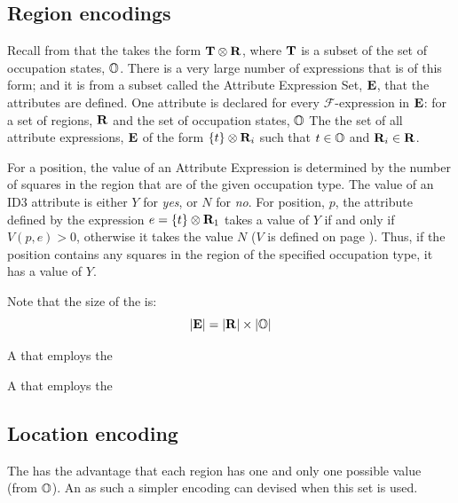 \subsection{Region encodings}
\label{sec:pos_attribs}
Recall from  that the  takes the form ${\bf T} \otimes {\bf R}$, where ${\bf T}$ is a subset of the set of occupation states, $\mathbb{O}$. There is a very large number of expressions that is of this form; and it is from a subset called the Attribute Expression Set, ${\bf E}$, that the attributes are defined.  One attribute is declared for every $\mathcal F$-expression in ${\bf E}$:
 {
for a set of regions, ${\bf R}$ and the set of occupation states, $\mathbb{O}$} {The the set of all attribute expressions, ${\bf E}$ of the form $\{t\} \otimes {\bf R}_i$ such that $t \in \mathbb{O} $ and $ {\bf R}_i \in {\bf R}$.}

For a position, the value of an Attribute Expression is determined by the number of squares in the region that are of the given occupation type.  The value of an ID3 attribute is either $Y$ for {\it yes}, or $N$ for {\it no}.  For position, $p$, the attribute defined by the expression $e = \{t\} \otimes {\bf R}_1$ takes a value of $Y$ if and only if $V(p,e) > 0$,  otherwise it takes the value $N$ ($V$ is defined on page  \pageref{sec:language-features}).  Thus, if the position contains any squares in the region of the specified occupation type, it has a value of $Y$.

Note that the size of the  is:
\begin{equation}
|{\bf E}| = |{\bf R}| \times |{\bf \mathbb{O}}|
\end{equation} 


 {A  that employs \newline the }

 {A  that employs \newline the }

\subsection{Location encoding}
The  has the advantage that each region has one and only one possible value (from $\mathbb{O} $).  An as such a simpler encoding can devised when this set is used.

